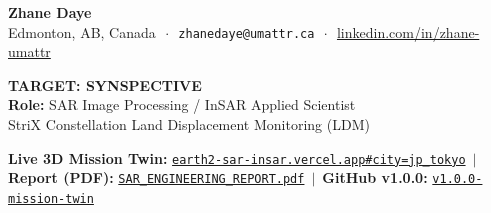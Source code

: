 \documentclass[10pt,letterpaper]{article}
\begin{document}
\begin{tcolorbox}[colframe=synspectivecrimson,colback=synspectivecrimson,coltext=white,boxrule=0pt,top=6pt,bottom=6pt]
\begin{minipage}[c]{0.58\textwidth}
    {\Large\textbf{Zhane Daye}} \\[2pt]
    {\footnotesize Edmonton, AB, Canada $\,\cdot\,$ \texttt{zhanedaye@umattr.ca} $\,\cdot\,$ \href{https://www.linkedin.com/in/zhane-umattr}{linkedin.com/in/zhane-umattr}}
\end{minipage}
\hfill
\begin{minipage}[c]{0.40\textwidth}
    \raggedleft
    {\large\textbf{TARGET: SYNSPECTIVE}}\\[1pt]
    {\footnotesize\textbf{Role:} SAR Image Processing / InSAR Applied Scientist}\\[1pt]
    {\scriptsize StriX Constellation Land Displacement Monitoring (LDM)}
\end{minipage}
\end{tcolorbox}

\vspace{-4pt}

\begin{tcolorbox}[colframe=bordergray,colback=lightbg,top=3pt,bottom=3pt]
\footnotesize
\textbf{Live 3D Mission Twin:} \href{https://earth2-sar-insar.vercel.app#city=jp_tokyo&preset=sar_focus&stage=v3}{\texttt{earth2-sar-insar.vercel.app\#city=jp\_tokyo}} $\,\vert\,$ 
\textbf{Report (PDF):} \href{https://earth2-sar-insar.vercel.app/reports/EARTH2_X_BAND_SAR_INSAR_ENGINEERING_REPORT.pdf}{\texttt{SAR\_ENGINEERING\_REPORT.pdf}} $\,\vert\,$ 
\textbf{GitHub v1.0.0:} \href{https://github.com/zrt219/earth2studio/releases/tag/v1.0.0-mission-twin}{\texttt{v1.0.0-mission-twin}}
\end{tcolorbox}

\vspace{-4pt}
\end{document}
